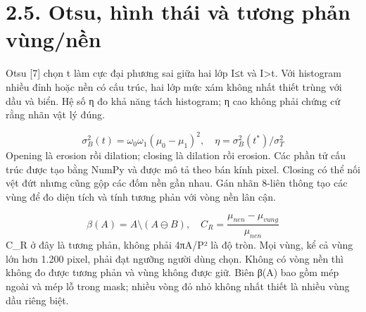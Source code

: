 \documentclass[13pt,a4paper]{extreport}
\begin{document}
\section*{2.5. Otsu, hình thái và tương phản vùng/nền}
Otsu [7] chọn t làm cực đại phương sai giữa hai lớp I≤t và I>t. Với histogram nhiều đỉnh hoặc nền có cấu trúc, hai lớp mức xám không nhất thiết trùng với dầu và biển. Hệ số η đo khả năng tách histogram; η cao không phải chứng cứ rằng nhãn vật lý đúng.
\par
\begin{equation}\sigma_B^2(t)=\omega_0\omega_1(\mu_0-\mu_1)^2,\quad \eta=\sigma_B^2(t^*)/\sigma_T^2\tag{2.8}\end{equation}
Opening là erosion rồi dilation; closing là dilation rồi erosion. Các phần tử cấu trúc được tạo bằng NumPy và được mô tả theo bán kính pixel. Closing có thể nối vệt đứt nhưng cũng gộp các đốm nền gần nhau. Gán nhãn 8-liên thông tạo các vùng để đo diện tích và tính tương phản với vòng nền lân cận.
\par
\begin{equation}\beta(A)=A\setminus(A\ominus B),\quad C_R=\frac{\mu_{nen}-\mu_{vung}}{\mu_{nen}}\tag{2.9}\end{equation}
C\_R ở đây là tương phản, không phải 4πA/P² là độ tròn. Mọi vùng, kể cả vùng lớn hơn 1.200 pixel, phải đạt ngưỡng người dùng chọn. Không có vòng nền thì không đo được tương phản và vùng không được giữ. Biên β(A) bao gồm mép ngoài và mép lỗ trong mask; nhiều vòng đỏ nhỏ không nhất thiết là nhiều vùng dầu riêng biệt.
\par
\clearpage
\end{document}
